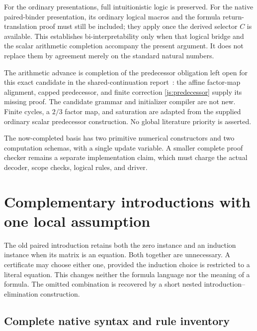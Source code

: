 \documentclass[11pt]{article}
\theoremstyle{definition}
\begin{document}
For the ordinary presentations, full intuitionistic logic is preserved.
For the native paired-binder presentation, its ordinary logical macros
and the formula return-translation proof must still be included; they
apply once the derived selector $C$ is available.  This establishes
bi-interpretability only when that logical bridge and the scalar
arithmetic completion accompany the present argument.  It does not
replace them by agreement merely on the standard natural numbers.

The arithmetic advance is completion of the predecessor obligation
left open for this exact candidate in the shared-continuation
report~\cite{shared}: the affine factor-map alignment, capped
predecessor, and finite correction \eqref{js:predecessor} supply its
missing proof.  The candidate grammar and initializer compiler are not
new.  Finite cycles, a $2/3$ factor map, and saturation are adapted from
the supplied ordinary scalar predecessor construction.  No global
literature priority is asserted.

The now-completed basis has two primitive numerical constructors and
two computation schemas, with a single update variable.  A smaller
complete proof checker remains a separate implementation claim, which
must charge the actual decoder, scope checks, logical rules, and driver.



\section{Complementary introductions with one local assumption}
\label{sec:choice-introduction}

The old paired introduction retains both the zero instance and an
induction instance when its matrix is an equation. Both together are
unnecessary. A certificate may choose either one, provided the induction
choice is restricted to a literal equation. This changes neither the
formula language nor the meaning of a formula. The omitted combination
is recovered by a short nested introduction--elimination construction.

\subsection{Complete native syntax and rule inventory}
\end{document}
